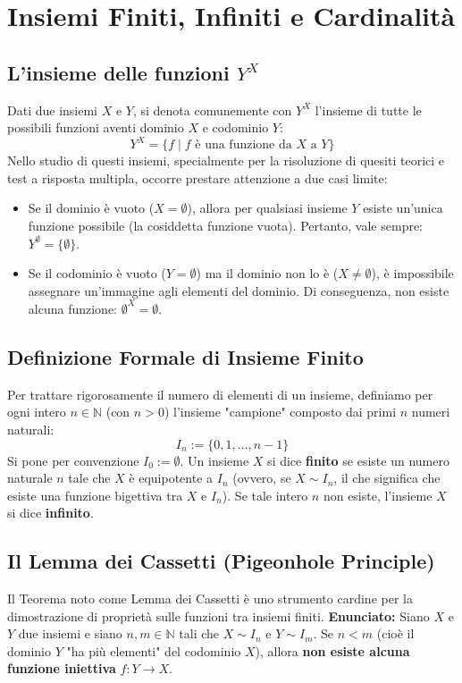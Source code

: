 \documentclass[12pt, a4paper]{article}
\begin{document}
\section{Insiemi Finiti, Infiniti e Cardinalità}

\subsection{L'insieme delle funzioni $Y^X$}
Dati due insiemi $X$ e $Y$, si denota comunemente con $Y^X$ l'insieme di tutte le possibili funzioni aventi dominio $X$ e codominio $Y$:
\[ Y^X = \{f \mid f \text{ è una funzione da } X \text{ a } Y\} \]
Nello studio di questi insiemi, specialmente per la risoluzione di quesiti teorici e test a risposta multipla, occorre prestare attenzione a due casi limite:
\begin{itemize}
    \item Se il dominio è vuoto ($X = \emptyset$), allora per qualsiasi insieme $Y$ esiste un'unica funzione possibile (la cosiddetta funzione vuota). Pertanto, vale sempre: $Y^\emptyset = \{\emptyset\}$.
    \item Se il codominio è vuoto ($Y = \emptyset$) ma il dominio non lo è ($X \neq \emptyset$), è impossibile assegnare un'immagine agli elementi del dominio. Di conseguenza, non esiste alcuna funzione: $\emptyset^X = \emptyset$.
\end{itemize}

\subsection{Definizione Formale di Insieme Finito}
Per trattare rigorosamente il numero di elementi di un insieme, definiamo per ogni intero $n \in \mathbb{N}$ (con $n > 0$) l'insieme "campione" composto dai primi $n$ numeri naturali:
\[ I_n := \{0, 1, \dots, n-1\} \]
Si pone per convenzione $I_0 := \emptyset$.
Un insieme $X$ si dice \textbf{finito} se esiste un numero naturale $n$ tale che $X$ è equipotente a $I_n$ (ovvero, se $X \sim I_n$, il che significa che esiste una funzione bigettiva tra $X$ e $I_n$). Se tale intero $n$ non esiste, l'insieme $X$ si dice \textbf{infinito}.

\subsection{Il Lemma dei Cassetti (Pigeonhole Principle)}
Il Teorema noto come Lemma dei Cassetti è uno strumento cardine per la dimostrazione di proprietà sulle funzioni tra insiemi finiti.
\textbf{Enunciato:} Siano $X$ e $Y$ due insiemi e siano $n, m \in \mathbb{N}$ tali che $X \sim I_n$ e $Y \sim I_m$. Se $n < m$ (cioè il dominio $Y$ "ha più elementi" del codominio $X$), allora \textbf{non esiste alcuna funzione iniettiva} $f: Y \to X$.
\end{document}
